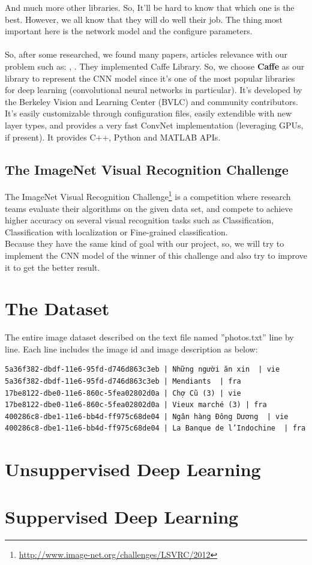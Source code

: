 \documentclass[hidelinks,12pt,a4paper]{report}
\begin{document}
And much more other libraries. So, It’ll be hard to know that which one is the best. However, we all know that they will do well their job. The thing most important here is the network model and the configure parameters. \\
\\
So, after some researched, we found many papers, articles relevance with our problem such as: \cite{placesdatabase}, \cite{landclassification}. They implemented Caffe Library. So, we choose \textbf{Caffe} as our library to represent the CNN model since it’s one of the most popular libraries for deep learning (convolutional neural networks in particular). It's developed by the Berkeley Vision and Learning Center (BVLC) and
community contributors. It’s easily customizable through configuration files, easily extendible with new layer types,
and provides a very fast ConvNet implementation (leveraging GPUs, if present). It provides C++, Python and MATLAB APIs.

\section{The ImageNet Visual Recognition Challenge}

The ImageNet Visual Recognition Challenge\footnote{\url{http://www.image-net.org/challenges/LSVRC/2012}} is a competition where research teams evaluate their algorithms on the given data set, and compete to achieve higher accuracy on several visual recognition tasks such as Classification, Classification with localization or Fine-grained classification. \\
Because they have the same kind of goal with our project, so, we will try to implement the CNN model of the winner of this challenge and also try to improve it to get the better result.

\chapter{The Dataset}
The entire image dataset described on the text file named ”photos.txt” line by line. Each line includes the image id and image description as below:
\begin{verbatim}
5a36f382-dbdf-11e6-95fd-d746d863c3eb | Những người ăn xin  | vie
5a36f382-dbdf-11e6-95fd-d746d863c3eb | Mendiants  | fra
17be8122-dbe0-11e6-860c-5fea02802d0a | Chợ Cũ (3) | vie
17be8122-dbe0-11e6-860c-5fea02802d0a | Vieux marché (3) | fra
400286c8-dbe1-11e6-bb4d-ff975c68de04 | Ngân hàng Đông Dương  | vie
400286c8-dbe1-11e6-bb4d-ff975c68de04 | La Banque de l’Indochine  | fra
\end{verbatim}
\chapter{Unsuppervised Deep Learning}
\chapter{Suppervised Deep Learning}



\end{document}
